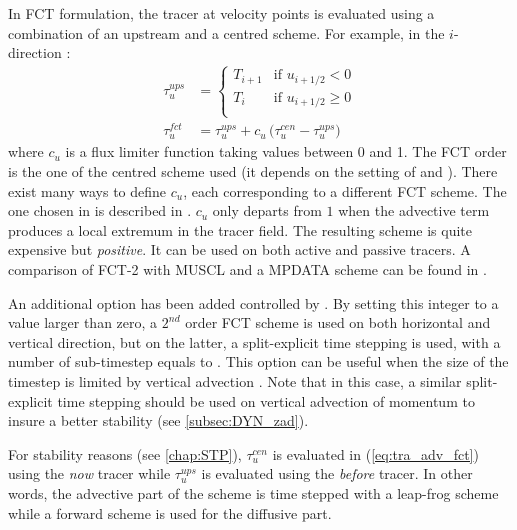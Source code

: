 \documentclass[../main/NEMO_manual]{subfiles}
\begin{document}
In FCT formulation, the tracer at velocity points is evaluated using a combination of an upstream and
a centred scheme.
For example, in the $i$-direction :
\begin{equation}
  \label{eq:tra_adv_fct}
  \begin{split}
    \tau_u^{ups} &=
    \begin{cases}
                     T_{i + 1} & \text{if~} u_{i + 1/2} <    0 \\
                     T_i       & \text{if~} u_{i + 1/2} \geq 0 \\
    \end{cases}
    \\
    \tau_u^{fct} &= \tau_u^{ups} + c_u \, \big( \tau_u^{cen} - \tau_u^{ups} \big)
  \end{split}
\end{equation}
where $c_u$ is a flux limiter function taking values between 0 and 1.
The FCT order is the one of the centred scheme used
(\ie it depends on the setting of  and ).
There exist many ways to define $c_u$, each corresponding to a different FCT scheme.
The one chosen in \NEMO is described in \citet{Zalesak_JCP79}.
$c_u$ only departs from $1$ when the advective term produces a local extremum in the tracer field.
The resulting scheme is quite expensive but \textit{positive}.
It can be used on both active and passive tracers.
A comparison of FCT-2 with MUSCL and a MPDATA scheme can be found in \citet{Levy_al_GRL01}.

An additional option has been added controlled by .
By setting this integer to a value larger than zero,
a $2^{nd}$ order FCT scheme is used on both horizontal and vertical direction, but on the latter,
a split-explicit time stepping is used, with a number of sub-timestep equals to .
This option can be useful when the size of the timestep is limited by vertical advection \citep{Lemarie_OM2015}.
Note that in this case, a similar split-explicit time stepping should be used on vertical advection of momentum to
insure a better stability (see \autoref{subsec:DYN_zad}).

For stability reasons (see \autoref{chap:STP}),
$\tau_u^{cen}$ is evaluated in (\autoref{eq:tra_adv_fct}) using the \textit{now} tracer while
$\tau_u^{ups}$ is evaluated using the \textit{before} tracer.
In other words, the advective part of the scheme is time stepped with a leap-frog scheme
while a forward scheme is used for the diffusive part.
\end{document}
